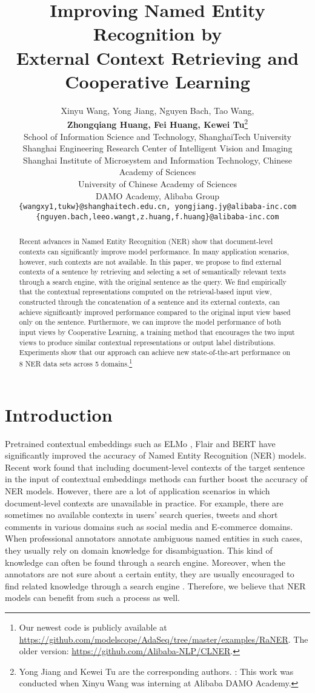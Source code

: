 \documentclass[11pt,a4paper]{article}
\title{Improving Named Entity Recognition by \\ External Context Retrieving and Cooperative Learning}
\author{Xinyu Wang, Yong Jiang\textsuperscript{}, Nguyen Bach, Tao Wang,\\
\textbf{Zhongqiang Huang, Fei Huang,  Kewei Tu}\thanks{\hspace{1mm} Yong Jiang and Kewei Tu are the corresponding authors. : This work was conducted when Xinyu Wang was interning at Alibaba DAMO Academy. } \\
 School of Information Science and Technology, ShanghaiTech University \\
 Shanghai Engineering Research Center of Intelligent Vision and Imaging \\
 Shanghai Institute of Microsystem and Information Technology, Chinese Academy of Sciences \\
 University of Chinese Academy of Sciences \\
 DAMO Academy, Alibaba Group \\
  {\tt \{wangxy1,tukw\}@shanghaitech.edu.cn, yongjiang.jy@alibaba-inc.com} \\
  {\tt \{nguyen.bach,leeo.wangt,z.huang,f.huang\}@alibaba-inc.com} \\
}
\date{}
\begin{document}
\maketitle
\begin{abstract}


Recent advances in Named Entity Recognition (NER) show that document-level contexts can significantly improve model performance. In many application scenarios, however, such contexts are not available. In this paper, we propose to find external contexts of a sentence by retrieving and selecting a set of semantically relevant texts through a search engine, with the original sentence as the query. We find empirically that the contextual representations computed on the retrieval-based input view, constructed through the concatenation of a sentence and its external contexts, can achieve significantly improved performance compared to the original input view based only on the sentence. Furthermore, we can improve the model performance of both input views by Cooperative Learning, a training method that encourages the two input views to produce similar contextual representations or output label distributions. Experiments show that our approach can achieve new state-of-the-art performance on 8 NER data sets across 5 domains.\footnote{Our newest code is publicly available at \url{https://github.com/modelscope/AdaSeq/tree/master/examples/RaNER}. The older version: \url{https://github.com/Alibaba-NLP/CLNER}.}

\end{abstract}

\section{Introduction}
Pretrained contextual embeddings such as ELMo \citep{peters-etal-2018-deep}, Flair \citep{akbik-etal-2018-contextual} and BERT \citep{devlin-etal-2019-bert} have significantly improved the accuracy of Named Entity Recognition (NER) models. Recent work \citep{devlin-etal-2019-bert,yu-etal-2020-named,yamada-etal-2020-luke} found that including document-level contexts of the target sentence in the input of contextual embeddings methods can further boost the accuracy of NER models. 
However, there are a lot of application scenarios in which document-level contexts are unavailable in practice. For example, there are sometimes no available contexts in users' search queries, tweets and short comments in various domains such as social media and E-commerce domains. When professional annotators annotate ambiguous named entities in such cases, they usually rely on domain knowledge for disambiguation. This kind of knowledge can often be found through a search engine. Moreover, when the annotators are not sure about a certain entity, they are usually encouraged to find related knowledge through a search engine \citep{wang-etal-2019-crossweigh}. Therefore, we believe that NER models can benefit from such a process as well. 
\end{document}
